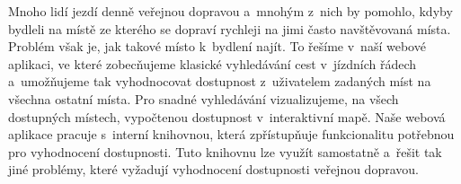 \documentclass[12pt]{report}
\begin{document}
Mnoho lidí jezdí denně veřejnou dopravou a~mnohým z~nich by pomohlo, kdyby bydleli na místě ze kterého se dopraví rychleji na jimi často navštěvovaná místa. Problém však je, jak takové místo k~bydlení najít.
To řešíme v~naší webové aplikaci, ve které zobecňujeme klasické vyhledávání cest v~jízdních řádech a~umožňujeme tak vyhodnocovat dostupnost z~uživatelem zadaných míst na všechna ostatní místa. Pro snadné vyhledávání vizualizujeme, na všech dostupných místech, vypočtenou dostupnost v~interaktivní mapě.
Naše webová aplikace pracuje s~interní knihovnou, která zpřístupňuje funkcionalitu potřebnou pro vyhodnocení dostupnosti. Tuto knihovnu lze využít samostatně a~řešit tak jiné problémy, které vyžadují vyhodnocení dostupnosti veřejnou dopravou.
\end{document}
